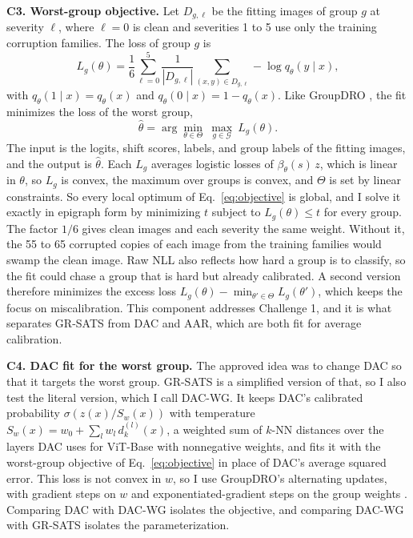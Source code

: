 \documentclass[sigconf,nonacm]{acmart}
\begin{document}
\textbf{C3. Worst-group objective.} Let $D_{g,\ell}$ be the fitting images of group $g$ at severity $\ell$, where $\ell = 0$ is clean and severities 1 to 5 use only the training corruption families. The loss of group $g$ is
\begin{equation}
  L_g(\theta) = \frac{1}{6}\sum_{\ell=0}^{5}\frac{1}{|D_{g,\ell}|}\sum_{(x,y)\in D_{g,\ell}} -\log q_\theta(y \mid x),
  \label{eq:grouploss}
\end{equation}
with $q_\theta(1 \mid x) = q_\theta(x)$ and $q_\theta(0 \mid x) = 1 - q_\theta(x)$. Like GroupDRO \cite{sagawa2020groupdro}, the fit minimizes the loss of the worst group,
\begin{equation}
  \hat{\theta} = \arg\min_{\theta \in \Theta}\ \max_{g \in \mathcal{G}}\ L_g(\theta).
  \label{eq:objective}
\end{equation}
The input is the logits, shift scores, labels, and group labels of the fitting images, and the output is $\hat{\theta}$. Each $L_g$ averages logistic losses of $\beta_\theta(s)\, z$, which is linear in $\theta$, so $L_g$ is convex, the maximum over groups is convex, and $\Theta$ is set by linear constraints. So every local optimum of Eq.~\eqref{eq:objective} is global, and I solve it exactly in epigraph form by minimizing $t$ subject to $L_g(\theta) \leq t$ for every group. The factor $1/6$ gives clean images and each severity the same weight. Without it, the 55 to 65 corrupted copies of each image from the training families would swamp the clean image. Raw NLL also reflects how hard a group is to classify, so the fit could chase a group that is hard but already calibrated. A second version therefore minimizes the excess loss $L_g(\theta) - \min_{\theta' \in \Theta} L_g(\theta')$, which keeps the focus on miscalibration. This component addresses Challenge 1, and it is what separates GR-SATS from DAC and AAR, which are both fit for average calibration.

\textbf{C4. DAC fit for the worst group.} The approved idea was to change DAC so that it targets the worst group. GR-SATS is a simplified version of that, so I also test the literal version, which I call DAC-WG. It keeps DAC's calibrated probability $\sigma(z(x)/S_w(x))$ with temperature $S_w(x) = w_0 + \sum_l w_l\, d_k^{(l)}(x)$, a weighted sum of $k$-NN distances over the layers DAC uses for ViT-Base with nonnegative weights, and fits it with the worst-group objective of Eq.~\eqref{eq:objective} in place of DAC's average squared error. This loss is not convex in $w$, so I use GroupDRO's alternating updates, with gradient steps on $w$ and exponentiated-gradient steps on the group weights \cite{sagawa2020groupdro}. Comparing DAC with DAC-WG isolates the objective, and comparing DAC-WG with GR-SATS isolates the parameterization.
\end{document}
